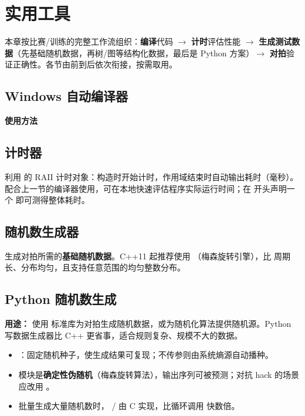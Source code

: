 \section{实用工具}

本章按比赛/训练的完整工作流组织：\textbf{编译}代码 $\to$ \textbf{计时}评估性能 $\to$ \textbf{生成测试数据}（先基础随机数据，再树/图等结构化数据，最后是 Python 方案）$\to$ \textbf{对拍}验证正确性。各节由前到后依次衔接，按需取用。

\subsection{Windows 自动编译器}



\textbf{使用方法}


\subsection{计时器}

利用  的 RAII 计时对象：构造时开始计时，作用域结束时自动输出耗时（毫秒）。配合上一节的编译器使用，可在本地快速评估程序实际运行时间；在  开头声明一个  即可测得整体耗时。



\subsection{随机数生成器}

生成对拍所需的\textbf{基础随机数据}。C++11 起推荐使用 （梅森旋转引擎），比  周期长、分布均匀，且支持任意范围的均匀整数分布。



\subsection{Python 随机数生成}

\textbf{用途：} 使用  标准库为对拍生成随机数据，或为随机化算法提供随机源。Python 写数据生成器比 C++ 更省事，适合规则复杂、规模不大的数据。

\begin{itemize}
  \item {}：固定随机种子，使生成结果可复现；不传参则由系统熵源自动播种。
  \item {} 模块是\textbf{确定性伪随机}（梅森旋转算法），输出序列可被预测；对抗 hack 的场景应改用 。
  \item 批量生成大量随机数时， /  由 C 实现，比循环调用  快数倍。
\end{itemize}

